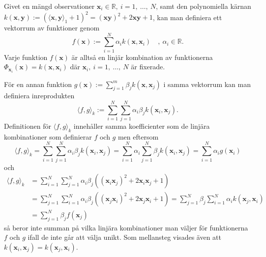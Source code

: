 \documentclass[a4paper, 12pt]{report}
\theoremstyle{definition}
\theoremstyle{remark}
\newcommand{\bfx}{\mathbf{x}}
\newcommand{\bfy}{\mathbf{y}}
\begin{document}
Givet en mängd observationer $\bfx_i\in\mathbb{R},~i=1,~\dots,~N$, samt den polynomiella kärnan $k\left(\bfx, \bfy\right):=\left(\langle \bfx, \bfy \rangle_1 + 1\right)^2 = \left(\bfx\bfy\right)^{2} + 2\bfx\bfy + 1$, kan man definiera ett vektorrum av funktioner genom
\begin{equation*}
	f\left(\bfx\right):=\sum_{i=1}^{N}\alpha_ik\left(\bfx, \bfx_i\right)\quad ,~\alpha_i\in\mathbb{R}.
\end{equation*}
Varje funktion $f\left(\bfx\right)$ är alltså en linjär kombination av funktionerna $\Phi_{\bfx_i}\left(\bfx\right)=k\left(\bfx,\bfx_i\right)$ där $\bfx_i,~i=1,~\dots,~N$ är fixerade. %

För en annan funktion $g\left(\bfx\right):=\sum_{j=1}^{m}\beta_jk\left(\bfx, \bfx_j\right)$ i samma vektorrum kan man definiera inreprodukten
\begin{equation}\label{eq:polykärnaprodukt}
	\langle f , g\rangle_k := \sum_{i=1}^{N}\sum_{j=1}^{N} \alpha_i \beta_j k\left(\bfx_i, \bfx_j\right).
\end{equation}
Definitionen för $\langle f, g \rangle_k$ innehåller samma koefficienter som de linjära kombinationer som definierar $f$ och $g$ men eftersom
\begin{equation}\label{eq:expansion1}
	\langle f, g \rangle_k = \sum_{i=1}^{N} \sum_{j=1}^{N} \alpha_i \beta_j k\left(\bfx_i, \bfx_j\right) = \sum_{i=1}^{N} \alpha_i \sum_{j=1}^{N}\beta_j k\left(\bfx_i, \bfx_j\right)=\sum_{i=1}^{N} \alpha_i g\left(\bfx_i\right)
\end{equation}
och
\begin{equation}\label{eq:expansion2}
\begin{aligned}
	\langle f, g \rangle_k &= \sum_{i=1}^{N} \sum_{j=1}^{N} \alpha_i \beta_j \left(\left(\bfx_i\bfx_j\right)^2 + 2\bfx_i\bfx_j+1\right)\\
	&= \sum_{j=1}^{N} \sum_{i=1}^{N} \alpha_i \beta_j \left(\left(\bfx_j\bfx_i\right)^2 + 2\bfx_j\bfx_i+1\right) = \sum_{j=1}^{N} \beta_j \sum_{i=1}^{N}\alpha_i k\left(\bfx_j, \bfx_i\right) \\
	&= \sum_{j=1}^{N} \beta_j f\left(\bfx_j\right)
\end{aligned}
\end{equation}
så beror inte summan på vilka linjära kombinationer man väljer för funktionerna $f$ och $g$ ifall de inte går att välja unikt. Som mellansteg visades även att $k\left(\bfx_i, \bfx_j\right)=k\left(\bfx_j, \bfx_i\right)$.
\end{document}
